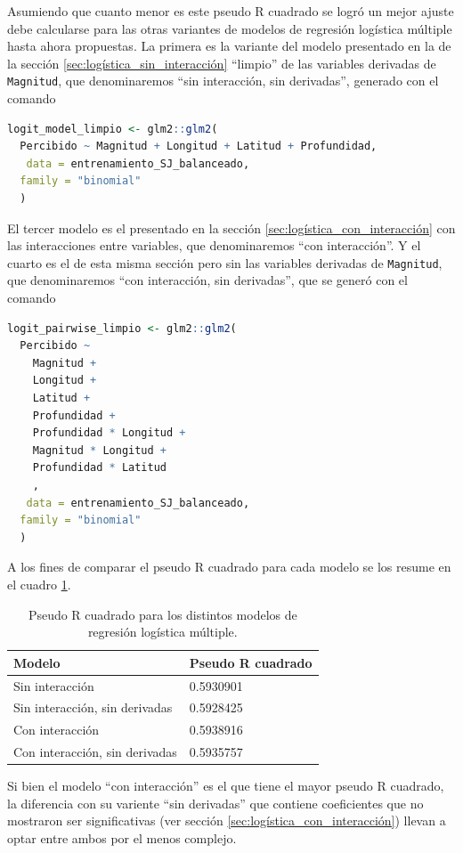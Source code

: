 \documentclass[a4paper]{report}
\begin{document}
Asumiendo que cuanto menor es este pseudo R cuadrado se logró un mejor ajuste debe calcularse para las otras variantes de modelos de regresión logística múltiple hasta ahora propuestas.
La primera es la variante del modelo presentado en la de la sección \ref{sec:logística_sin_interacción} ``limpio'' de las variables derivadas de \verb'Magnitud', que denominaremos ``sin interacción, sin derivadas'', generado con el comando
\begin{lstlisting}[language=R, breaklines=true]
logit_model_limpio <- glm2::glm2(
  Percibido ~ Magnitud + Longitud + Latitud + Profundidad,
   data = entrenamiento_SJ_balanceado,
  family = "binomial"
  )
\end{lstlisting}

El tercer modelo es el presentado en la sección \ref{sec:logística_con_interacción} con las interacciones entre variables, que denominaremos ``con interacción''.
Y el cuarto es el de esta misma sección pero sin las variables derivadas de \verb'Magnitud', que denominaremos ``con interacción, sin derivadas'', que se generó con el comando
\begin{lstlisting}[language=R, breaklines=true]
	logit_pairwise_limpio <- glm2::glm2(
  Percibido ~
    Magnitud +
    Longitud +
    Latitud +
    Profundidad +
    Profundidad * Longitud +
    Magnitud * Longitud +
    Profundidad * Latitud
    ,
   data = entrenamiento_SJ_balanceado,
  family = "binomial"
  )
\end{lstlisting}

A los fines de comparar el pseudo R cuadrado para cada modelo se los resume en el cuadro \ref{tab:pseudo_r2}.
\begin{table}[!ht]
	\centering
	\begin{tabular}{ll}
		\toprule
		Modelo & Pseudo R cuadrado\\
		\midrule
		Sin interacción & 0.5930901\\
		Sin interacción, sin derivadas &  0.5928425\\
		Con interacción &  0.5938916\\
		Con interacción, sin derivadas & 0.5935757\\
		\bottomrule
	\end{tabular}
	\caption{Pseudo R cuadrado para los distintos modelos de regresión logística múltiple.}
	\label{tab:pseudo_r2}
\end{table}

Si bien el modelo ``con interacción'' es el que tiene el mayor pseudo R cuadrado, la diferencia con su variente ``sin derivadas'' que contiene coeficientes que no mostraron ser significativas (ver sección \ref{sec:logística_con_interacción}) llevan a optar entre ambos por el menos complejo.
\end{document}
